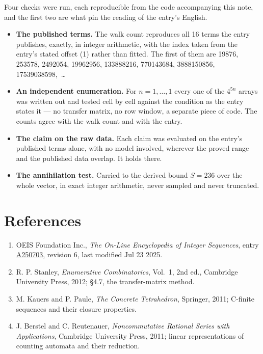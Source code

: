 \documentclass[11pt]{article}
\theoremstyle{definition}
\begin{document}
Four checks were run, each reproducible from the code accompanying this note, and the first two are what pin the reading of the entry's English.

\begin{itemize}

\item {\bfseries The published terms.} The walk count reproduces all 16 terms the entry publishes, exactly, in integer arithmetic, with the index taken from the entry's stated offset (1) rather than fitted. The first of them are 19876, 253578, 2492054, 19962956, 133888216, 770143684, 3888150856, 17539038598,~\dots

\item {\bfseries An independent enumeration.} For $n = 1,\dots,1$ every one of the $4^{5n}$ arrays was written out and tested cell by cell against the condition as the entry states it --- no transfer matrix, no row window, a separate piece of code. The counts agree with the walk count and with the entry.

\item {\bfseries The claim on the raw data.} Each claim was evaluated on the entry's published terms alone, with no model involved, wherever the proved range and the published data overlap. It holds there.

\item {\bfseries The annihilation test.} Carried to the derived bound $S = 236$ over the whole vector, in exact integer arithmetic, never sampled and never truncated.

\end{itemize}

\section{References}

\begin{enumerate}

\item OEIS Foundation Inc., \emph{The On-Line Encyclopedia of Integer Sequences}, entry \href{https://oeis.org/A250703}{A250703}, revision 6, last modified Jul 23 2025.

\item R. P. Stanley, \emph{Enumerative Combinatorics}, Vol.~1, 2nd ed., Cambridge University Press, 2012; \S4.7, the transfer-matrix method.

\item M. Kauers and P. Paule, \emph{The Concrete Tetrahedron}, Springer, 2011; C-finite sequences and their closure properties.

\item J. Berstel and C. Reutenauer, \emph{Noncommutative Rational Series with Applications}, Cambridge University Press, 2011; linear representations of counting automata and their reduction.

\end{enumerate}
\end{document}
